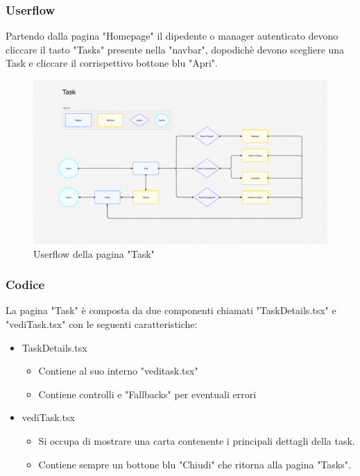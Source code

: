 \documentclass{report}
\begin{document}
\subsubsection*{Userflow}
Partendo dalla pagina "Homepage" il dipedente o manager autenticato devono cliccare il tasto "Tasks" presente nella "navbar", dopodichè devono scegliere una Task e cliccare il corrispettivo bottone blu "Apri".
\begin{figure}[H]
	\centering\includegraphics[width=1\textwidth]{images/microservizio-task/frontend/task-userflow.png}
	Userflow della pagina "Task"
\end{figure}

\subsubsection*{Codice}
La pagina "Task" è composta da due componenti chiamati "TaskDetails.tsx" e "vediTask.tsx" con le seguenti caratteristiche:
\begin{itemize}
	\item TaskDetails.tsx
	\begin{itemize}
		\item Contiene al suo interno "veditask.tsx"
		\item Contiene controlli e "Fallbacks" per eventuali errori
	\end{itemize}
	\item vediTask.tsx
	\begin{itemize}
		\item Si occupa di mostrare una carta contenente i principali dettagli della task.
		\item Contiene sempre un bottone blu "Chiudi" che ritorna alla pagina "Tasks".
	\end{itemize}
\end{itemize}
\end{document}
